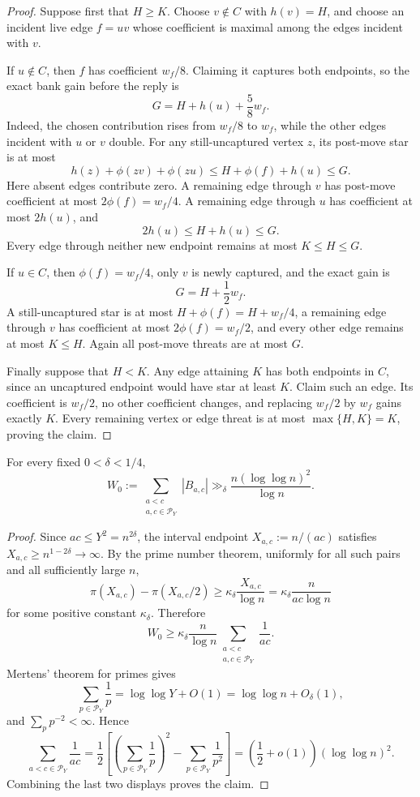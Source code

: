 \begin{proof}
Suppose first that $H\ge K$.  Choose $v\notin C$ with $h(v)=H$, and choose
an incident live edge $f=uv$ whose coefficient is maximal among the edges
incident with $v$.

If $u\notin C$, then $f$ has coefficient $w_f/8$.  Claiming it captures both
endpoints, so the exact bank gain before the reply is
\[
  G=H+h(u)+\frac58w_f.
\]
Indeed, the chosen contribution rises from $w_f/8$ to $w_f$, while the other
edges incident with $u$ or $v$ double.  For any still-uncaptured vertex $z$,
its post-move star is at most
\[
  h(z)+\phi(zv)+\phi(zu)
  \le H+\phi(f)+h(u)
  \le G.
\]
Here absent edges contribute zero.  A remaining edge through $v$ has
post-move coefficient at most $2\phi(f)=w_f/4$.  A remaining edge through
$u$ has coefficient at most $2h(u)$, and
\[
  2h(u)\le H+h(u)\le G.
\]
Every edge through neither new endpoint remains at most $K\le H\le G$.

If $u\in C$, then $\phi(f)=w_f/4$, only $v$ is newly captured, and the exact
gain is
\[
  G=H+\frac12w_f.
\]
A still-uncaptured star is at most
$H+\phi(f)=H+w_f/4$, a remaining edge through $v$ has coefficient at most
$2\phi(f)=w_f/2$, and every other edge remains at most $K\le H$.  Again all
post-move threats are at most $G$.

Finally suppose that $H<K$.  Any edge attaining $K$ has both endpoints in
$C$, since an uncaptured endpoint would have star at least $K$.  Claim such an
edge.  Its coefficient is $w_f/2$, no other coefficient changes, and replacing
$w_f/2$ by $w_f$ gains exactly $K$.  Every remaining vertex or edge threat is
at most $\max\{H,K\}=K$, proving the claim.
\end{proof}

\begin{proposition}\label{prop:t2-initial-mass}
For every fixed $0<\delta<1/4$,
\[
  W_0
  :=
  \sum_{\substack{a<c\\a,c\in\mathcal P_Y}} |B_{a,c}|
  \gg_\delta
  \frac{n(\log\log n)^2}{\log n}.
\]
\end{proposition}

\begin{proof}
Since $ac\le Y^2=n^{2\delta}$, the interval endpoint
$X_{a,c}:=n/(ac)$ satisfies $X_{a,c}\ge n^{1-2\delta}\to\infty$.  By the prime
number theorem, uniformly for all such pairs and all sufficiently large $n$,
\[
  \pi(X_{a,c})-\pi(X_{a,c}/2)
  \ge
  \kappa_\delta \frac{X_{a,c}}{\log n}
  =
  \kappa_\delta \frac{n}{ac\log n}
\]
for some positive constant $\kappa_\delta$.  Therefore
\[
  W_0
  \ge
  \kappa_\delta\frac{n}{\log n}
  \sum_{\substack{a<c\\a,c\in\mathcal P_Y}}\frac1{ac}.
\]
Mertens' theorem for primes gives
\[
  \sum_{p\in\mathcal P_Y}\frac1p
  =
  \log\log Y+O(1)
  =
  \log\log n+O_\delta(1),
\]
and $\sum_p p^{-2}<\infty$.  Hence
\[
  \sum_{a<c\in\mathcal P_Y}\frac1{ac}
  =
  \frac12\left[
    \left(\sum_{p\in\mathcal P_Y}\frac1p\right)^2
    -
    \sum_{p\in\mathcal P_Y}\frac1{p^2}
  \right]
  =
  \left(\frac12+o(1)\right)(\log\log n)^2.
\]
Combining the last two displays proves the claim.
\end{proof}

